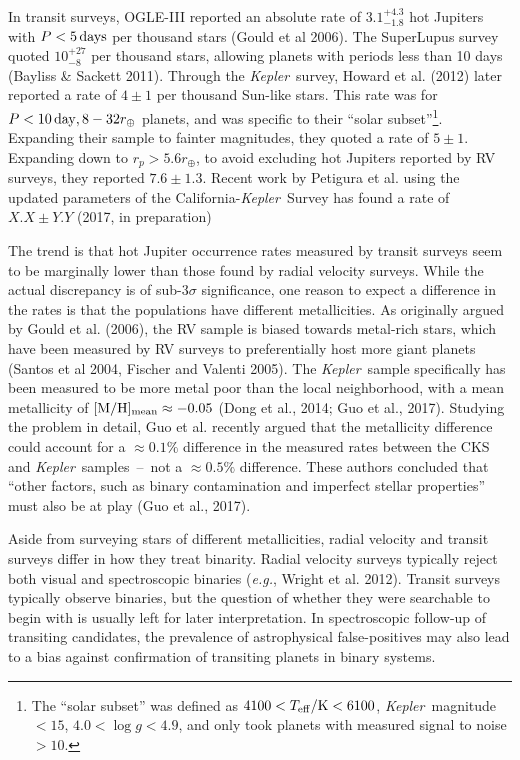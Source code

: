 In transit surveys, OGLE-III reported an absolute rate of $3.1^{+ 
4.3}_{-1.8}$ hot Jupiters with $P<5\,{\rm days}$ per thousand stars (Gould et 
al 2006).
The SuperLupus survey quoted $10^{+27}_{-8}$ per thousand stars, allowing 
planets with periods less than 10 days (Bayliss \& Sackett 2011).
Through the {\it Kepler}\ survey, Howard et al. (2012) later reported a rate 
of 
$4 \pm 1$ per thousand Sun-like stars.
This rate was for $P<10\,{\rm day}, 8-32r_\oplus$ planets, and 
was specific to their ``solar subset''\footnote{The ``solar subset'' was 
defined as $4100<T_{\rm eff}/{\rm K}<6100$, {\it Kepler}\ 
magnitude $<15$, $4.0 < \log g < 4.9$, and only took planets with measured 
signal to noise $>10$.
}.
Expanding their sample to fainter magnitudes, they quoted a rate of $5 \pm 
1$.
Expanding down to $r_p>5.6r_\oplus$, to avoid excluding hot Jupiters reported 
by RV surveys, they reported $7.6 \pm 1.3$.
Recent work by Petigura et al. using the updated parameters of the 
California-{\it Kepler}\ Survey has found a rate of $X.X \pm 
Y.Y$ (2017, in preparation)

The trend is that hot Jupiter occurrence rates measured by transit 
surveys seem to be marginally lower than those found by radial velocity 
surveys.
While the actual discrepancy is of sub-$3\sigma$ significance,
one reason to expect a difference in the rates is that the populations have 
different metallicities.
As originally argued by Gould et al. (2006), the RV sample is biased towards 
metal-rich stars, which have been measured by RV surveys to preferentially 
host more giant planets (Santos et al 2004, Fischer and Valenti 2005).
The {\it Kepler}\ sample specifically has been measured to be more metal poor 
than the local neighborhood, with a mean metallicity of $[{\rm M/H}]_{\rm 
mean}\approx -0.05$ (Dong et al., 2014; Guo et al., 2017).
Studying the problem in detail, Guo et al. recently argued that the 
metallicity difference could account for a $\approx 0.1\%$ difference in the 
measured rates between the CKS and {\it Kepler}\ samples~--~not a $\approx 
0.5\%$ difference.
These authors concluded that ``other factors, such as binary contamination and 
imperfect stellar properties'' must also be at play (Guo et al., 2017).

Aside from surveying stars of different metallicities, radial velocity and 
transit surveys differ in how they treat binarity.
Radial velocity surveys typically reject both visual and spectroscopic binaries
({\it e.g.}, Wright et al. 2012).
Transit surveys typically observe binaries, but the question of whether they 
were searchable to begin with is usually left for later interpretation.
In spectroscopic follow-up of transiting candidates, the prevalence of 
astrophysical false-positives may also lead to a bias against confirmation of 
transiting planets in binary systems.

